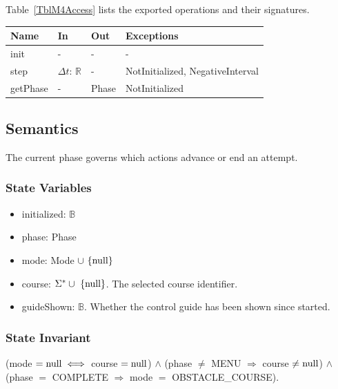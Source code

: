 \documentclass[12pt, titlepage]{article}
\newcommand{\nul}{\textnormal{null}}
\begin{document}
Table~\ref{TblM4Access} lists the exported operations and their signatures.

\begin{center}
\begin{minipage}{\textwidth}
\begin{tabularx}{\textwidth}{p{3.2cm} p{2.6cm} p{2.6cm} X}
\toprule
\textbf{Name} & \textbf{In} & \textbf{Out} & \textbf{Exceptions} \\
\midrule
init & - & - & - \\
step & $\Delta t$: $\mathbb{R}$ & - & NotInitialized, NegativeInterval \\
getPhase & - & Phase & NotInitialized \\
\bottomrule
\end{tabularx}
\label{TblM4Access}
\end{minipage}
\end{center}

\subsection{Semantics}

The current phase governs which actions advance or end an attempt.

\subsubsection{State Variables}

\begin{itemize}
\item initialized: $\mathbb{B}$
\item phase: Phase
\item mode: Mode $\cup \ \{\nul\}$
\item course: $\Sigma^* \cup \ \{\nul\}$. The selected course identifier.
\item guideShown: $\mathbb{B}$. Whether the control guide has been shown since
  \progname{} started.
\end{itemize}

\subsubsection{State Invariant}

(mode $= \nul \iff$ course $= \nul$) $\wedge$ (phase $\neq$ MENU
$\Rightarrow$ course $\neq \nul$) $\wedge$ (phase $=$ COMPLETE $\Rightarrow$
mode $=$ OBSTACLE\_COURSE).
\end{document}
